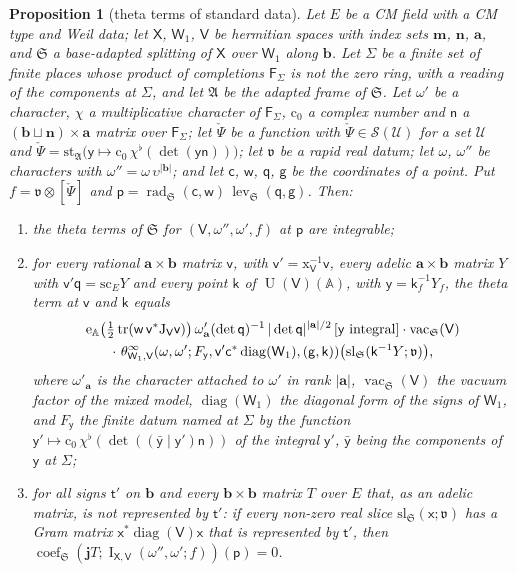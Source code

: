 \documentclass[11pt,a4paper]{article}
\theoremstyle{plainx}
\newtheorem{proposition}[theorem]{Proposition}
\theoremstyle{uprightx}
\newcommand{\dL}{\check{\Psi}}         %
\newcommand{\sF}{\mathsf{F}}
\newcommand{\ba}{\mathbf{a}}
\newcommand{\bb}{\mathbf{b}}
\newcommand{\bm}{\mathbf{m}}
\newcommand{\bn}{\mathbf{n}}
\newcommand{\sW}{\mathsf{W}}
\newcommand{\sV}{\mathsf{V}}
\newcommand{\sX}{\mathsf{X}}
\newcommand{\sg}{\mathsf{g}}
\newcommand{\sk}{\mathsf{k}}
\newcommand{\sx}{\mathsf{x}}
\newcommand{\sy}{\mathsf{y}}
\newcommand{\sq}{\mathsf{q}}
\newcommand{\fv}{\mathfrak{v}}
\newcommand{\fS}{\mathfrak{S}}
\newcommand{\fA}{\mathfrak{A}}
\newcommand{\rc}{\mathrm{c}}
\newcommand{\A}{\mathbb{A}}
\newcommand{\U}{\operatorname{U}}
\newcommand{\tr}{\operatorname{tr}}
\newcommand{\cS}{\mathcal{S}}
\newcommand{\inu}[1]{#1^{\flat}}
\newcommand{\thI}[5]{\operatorname{I}_{#1,#2}(#3,#4;#5)}
\newcommand{\cf}[3]{\operatorname{coef}_{#1}(#2;#3)}
\newcommand{\loc}[2]{#1\otimes#2}
\begin{document}
\begin{proposition}[theta terms of standard data]\label{p:terms}
Let $E$ be a CM field with a CM type and Weil data; let $\sX$, $\sW_1$, $\sV$ be hermitian spaces with index sets
$\bm$, $\bn$, $\ba$, and $\fS$ a base-adapted splitting of $\sX$ over $\sW_1$ along $\bb$.
Let $\Sigma$ be a finite set of finite places whose product of completions $\sF_\Sigma$ is not the zero ring, with
a reading of the components at $\Sigma$, and let $\fA$ be the adapted frame of $\fS$. Let $\omega'$ be a
character, $\chi$ a multiplicative character of $\sF_\Sigma$, $\rc_0$ a complex number and $\mathsf{n}$ a
$(\bb\sqcup\bn)\times\ba$ matrix over $\sF_\Sigma$; let $\dL$ be a function with $\dL\in\cS(\mathcal{U})$ for a
set $\mathcal{U}$ and $\dL=\mathrm{st}_{\fA}\bigl(\sy\mapsto\rc_0\,\inu{\chi}(\det(\sy\mathsf{n}))\bigr)$; let
$\fv$ be a rapid real datum; let $\omega$, $\omega''$ be characters with $\omega''=\omega\,\upsilon^{|\bb|}$; and
let $\mathsf{c}$, $\mathsf{w}$, $\sq$, $\sg$ be the coordinates of a point. Put $f=\loc{\fv}{[\dL]}$ and
$\mathsf{p}=\operatorname{rad}_{\fS}(\mathsf{c},\mathsf{w})\,\operatorname{lev}_{\fS}(\sq,\sg)$. Then:
\begin{enumerate}[label=\textup{(\arabic*)},leftmargin=2.3em,itemsep=1pt]
\item the theta terms of $\fS$ for $(\sV,\omega'',\omega',f)$ at $\mathsf{p}$ are integrable;
\item for every rational $\ba\times\bb$ matrix $\mathsf{v}$, with $\mathsf{v}'=\mathrm{x}_{\sV}^{-1}\mathsf{v}$,
every adelic $\ba\times\bb$ matrix $Y$ with $\mathsf{v}'\sq=\mathrm{sc}_EY$ and every point $\sk$ of $\U(\sV)(\A)$,
with $\sy=\sk_f^{-1}Y_f$, the theta term at $\mathsf{v}$ and $\sk$ equals
\begin{multline*}
\mathrm{e}_{\A}\bigl(\tfrac12\tr(\mathsf{w}\,\mathsf{v}^{*}\mathrm{J}_{\sV}\mathsf{v})\bigr)\,\omega'_{\ba}(\det\sq)^{-1}\,|\det\sq|^{|\ba|/2}\,
[\sy\text{ integral}]\cdot\operatorname{vac}_{\fS}(\sV)\\
\cdot\ \thetaOnRealData{\sW_1}{\sV}{\omega}{\omega'}{F_{\sy}}{\mathsf{v}'\mathsf{c}^{*}\operatorname{diag}(\sW_1)}{(\sg,\sk)}\bigl(\mathrm{sl}_{\fS}(\sk^{-1}Y;\fv)\bigr),
\end{multline*}
where $\omega'_{\ba}$ is the character attached to $\omega'$ in rank $|\ba|$, $\operatorname{vac}_{\fS}(\sV)$ the
vacuum factor of the mixed model, $\operatorname{diag}(\sW_1)$ the diagonal form of the signs of $\sW_1$, and
$F_{\sy}$ the finite datum named at $\Sigma$ by the function
$\sy'\mapsto\rc_0\,\inu{\chi}(\det((\bar{\sy}\mid\sy')\mathsf{n}))$ of the integral $\sy'$, $\bar{\sy}$ being the
components of $\sy$ at $\Sigma$;
\item for all signs $\mathsf{t}'$ on $\bb$ and every $\bb\times\bb$ matrix $T$ over $E$ that, as an adelic matrix, is not represented
by $\mathsf{t}'$: if every non-zero real slice $\mathrm{sl}_{\fS}(\sx;\fv)$ has a Gram matrix
$\sx^{*}\operatorname{diag}(\sV)\sx$ that is represented by $\mathsf{t}'$, then
$\cf{\fS}{\mathbf{j} T}{\thI{\sX}{\sV}{\omega''}{\omega'}{f}}(\mathsf{p})=0$.
\end{enumerate}
\end{proposition}
\end{document}
